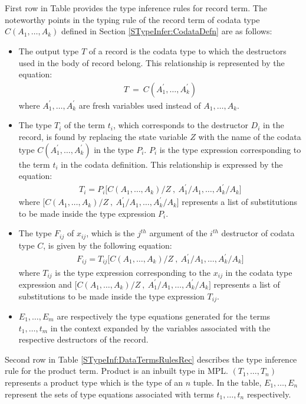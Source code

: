 \documentclass[11pt]{article}
\begin{document}
~~\\~~\\ 
First row in Table provides the type inference rules for {\sf record} term. The noteworthy points in the typing rule of the {\sf record} term of codata type ${C(A_1,\ldots,A_k)}$ defined in Section \ref {STypeInfer:CodataDefn} are as follows:
\begin{itemize}
  \item The output type ${T}$ of a {\sf record} is the codata type to which the destructors used in the body of {\sf record} belong. This relationship is represented by the equation:
  \begin{align*}
    T~=~C(A_1^\prime,\ldots,A_k^\prime)
  \end{align*}
  where ${A_1^\prime,\ldots,A_k^\prime}$ are fresh variables used instead of ${A_1,\ldots,A_k}$.
  \item The type ${T_i}$ of the term ${t_i}$, which corresponds to the destructor $D_i$ in the record, is found by replacing the state variable ${Z}$ with the name of the codata type ${C(A_1^\prime,\ldots,A_k^\prime)}$ in the type ${P_i}$. ${P_i}$ is the type expression corresponding to the term ${t_i}$ in the codata definition. This relationship is expressed by the equation:
  \begin{align*}
    T_i = P_i \Big[C(A_1,\ldots,A_k)/Z~,~A_1^\prime/A_1,\ldots,A_k^\prime/A_k\Big]
  \end{align*}
where ${\big[C(A_1,\ldots,A_k)/Z~,~A_1^\prime/A_1,\ldots,A_k^\prime/A_k\big]}$ represents a list of substitutions to be made inside the type expression ${P_i}$.

\item The type ${F_{ij}}$ of ${x_{ij}}$, which is the ${j^{th}}$ argument of the ${i^{th}}$ destructor of codata type ${C}$, is given by the following equation:
\begin{align*}
F_{ij}= T_{ij} \Big[C(A_1,\ldots,A_k)/Z~,~A_1^\prime/A_1,\ldots,A_k^\prime/A_k\Big]
\end{align*}
where ${T_{ij}}$ is the type expression corresponding to the ${x_{ij}}$ in the codata type expression and ${\big[C(A_1,\ldots,A_k)/Z~,~A_1^\prime/A_1,\ldots,A_k^\prime/A_k\big]}$ represents a list of substitutions to be made inside the type expression ${T_{ij}}$.
\item ${E_1,\ldots,E_m}$ are respectively the type equations generated for the terms ${t_1,\ldots,t_m}$ in the context expanded by the variables associated with the respective destructors of the {\sf record}. 
\end{itemize}
Second row in Table \ref {STypeInf:DataTermsRulesRec} 
describes the type inference rule for the {\sf product} term. Product is an inbuilt type in MPL. ${(T_1,\ldots,T_n)}$ represents a product type which is the type of an ${n}$ tuple. In the table, ${E_1,\ldots,E_n}$ represent the sets of type equations associated with terms ${t_1,\ldots,t_n}$ respectively.
\end{document}
